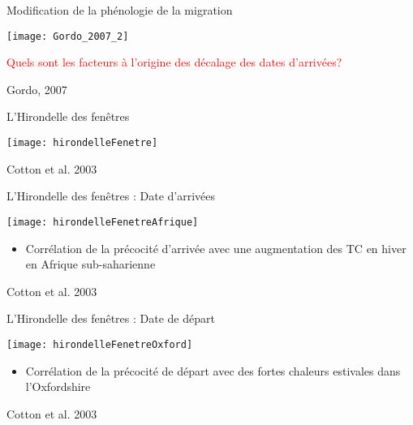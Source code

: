 \documentclass[10pt]{beamer}
\begin{document}
 \begin{frame}{Modification de la phénologie de la migration}
  \begin{center}
   \texttt{[image: Gordo\_2007\_2]}
  
  \vspace{20pt}
    \textcolor{red}{Quels sont les facteurs à l’origine des décalage des dates d'arrivées?}
    
  \end{center}
  \begin{tiny}
    Gordo, 2007

  \end{tiny}
\end{frame}

\begin{frame}{L'Hirondelle des fenêtres}
  \begin{center}
    \texttt{[image: hirondelleFenetre]}
  \end{center}
  \begin{tiny}
    Cotton et al. 2003

  \end{tiny}
\end{frame}

\begin{frame}{L'Hirondelle des fenêtres : Date d'arrivées}
  \begin{center}
    \texttt{[image: hirondelleFenetreAfrique]}
  \end{center}
  \vspace{10pt}
  \begin{itemize}
   \item <2> Corrélation de la précocité d’arrivée avec une augmentation des T\degres C en hiver en Afrique sub-saharienne
  \end{itemize}
  \begin{tiny}
    Cotton et al. 2003

  \end{tiny}
\end{frame}

\begin{frame}{L'Hirondelle des fenêtres : Date de départ}
  \begin{center}
    \texttt{[image: hirondelleFenetreOxford]}
  \end{center}
  \vspace{10pt}
    \begin{itemize}
   \item <2> Corrélation de la précocité de départ avec des fortes chaleurs estivales dans l’Oxfordshire
    \end{itemize}
  \begin{tiny}
    Cotton et al. 2003
  \end{tiny}
\end{frame}
\end{document}
